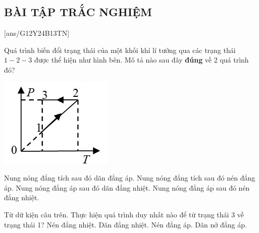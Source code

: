 \subsection{BÀI TẬP TRẮC NGHIỆM}
\setcounter{ex}{0}
[ans/G12Y24B13TN]
\begin{ex}
	Quá trình biến đổi trạng thái của một khối khí lí tưởng qua các trạng thái $1-2-3$ được thể hiện như hình bên. Mô tả nào sau đây \textbf{đúng} về 2 quá trình đó?
	\begin{center}
		\includegraphics[width=0.3\linewidth]{figs/VN12-Y24-PH-SYL-014P-9}
	\end{center}
	
	\choice
	{Nung nóng đẳng tích sau đó dãn đẳng áp.}
	{\True Nung nóng đẳng tích sau đó nén đẳng áp.}
	{Nung nóng đẳng áp sau đó dãn đẳng nhiệt.}
	{Nung nóng đẳng áp sau đó nén đẳng nhiệt.}
	\loigiai{}
\end{ex}
\begin{ex}
Từ dữ kiện câu trên. Thực hiện quá trình duy nhất nào để từ trạng thái 3 về trạng thái 1?	
	\choice
	{Nén đẳng nhiệt.}
	{\True Dãn đẳng nhiệt.}
	{Nén đẳng áp.}
	{Dãn nở đẳng áp.}
	\loigiai{}
\end{ex}
